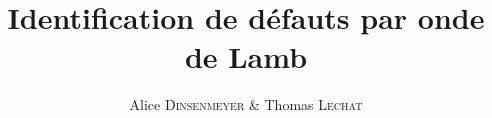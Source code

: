 \documentclass[twoside]{article}
\title{\vspace{-15mm}\fontsize{24pt}{10pt}\selectfont\textbf{Identification de défauts par onde de Lamb}} %
\author{
\large
{Alice \textsc{Dinsenmeyer} \& Thomas \textsc{Lechat}}\\[2mm] %
\vspace{-5mm}
}
\date{}
\begin{document}
\maketitle %

\thispagestyle{fancy} %


\begin{abstract}


\end{abstract}

\end{document}
